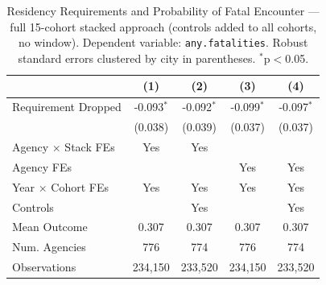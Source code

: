 \begin{table}[t]\centering
\caption{Residency Requirements and Probability of Fatal Encounter --- full
15-cohort stacked approach (controls added to all cohorts, no window). Dependent
variable: \texttt{any.fatalities}. Robust standard errors clustered by city in
parentheses. $^{*}$p$<$0.05.}
\label{tab:fatal-full15-reg}
\begin{tabular}{lcccc}
\toprule
 & (1) & (2) & (3) & (4) \\
\midrule
Requirement Dropped & -0.093$^{*}$ & -0.092$^{*}$ & -0.099$^{*}$ & -0.097$^{*}$ \\
 & (0.038) & (0.039) & (0.037) & (0.037) \\
\midrule
Agency $\times$ Stack FEs & Yes & Yes &  &  \\
Agency FEs &  &  & Yes & Yes \\
Year $\times$ Cohort FEs & Yes & Yes & Yes & Yes \\
Controls &  & Yes &  & Yes \\
Mean Outcome & 0.307 & 0.307 & 0.307 & 0.307 \\
Num. Agencies & 776 & 774 & 776 & 774 \\
Observations & 234,150 & 233,520 & 234,150 & 233,520 \\
\bottomrule
\end{tabular}
\end{table}
